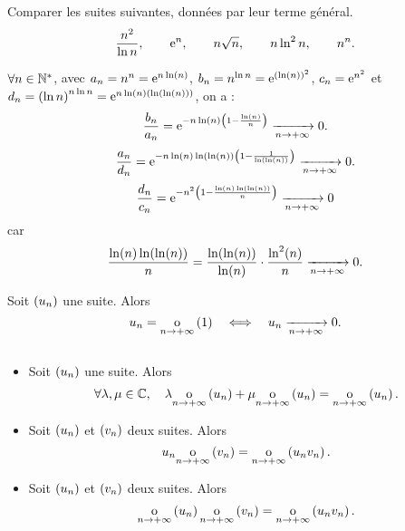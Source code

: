 \documentclass{magnoliaold}
\begin{document}
\begin{exoUnique}
\exo Comparer les suites suivantes, données par leur terme général.
  \[\frac{n^2}{\ln n}, \qquad {\rm e}^{n},\qquad n\sqrt{n}, \qquad n \ln^2 n, \qquad n^n.\]
\end{exoUnique}

\begin{sol}
$\forall n \in {\mathbb{N}^*}$, avec $a_n=n^n={\rm e}^{n\ln(n)}$, $b_n=n^{\ln n}={\rm e}^{\left(\ln(n)\right)^2}$, $c_n={\rm e}^{n^2}$ et $d_n=\left(\ln n\right)^{n\ln n}={\rm e}^{n\ln(n)\left(\ln(\ln(n))\right)}$, on a :
$$\frac{b_n}{a_n}={\rm e}^{-n\ln(n)\left(1-\frac{\ln(n)}{n}\right)}\xrightarrow[n\rightarrow +\infty]{}{0}.$$
$$\frac{a_n}{d_n}={\rm e}^{-n\ln(n)\ln(\ln(n))\left(1-\frac{1}{\ln(\ln(n))}\right)}\xrightarrow[n\rightarrow +\infty]{}{0}.$$
$$\frac{d_n}{c_n}={\rm e}^{-n^2\left(1-\frac{\ln(n)\ln(\ln(n))}{n}\right)}\xrightarrow[n\rightarrow +\infty]{}{0}$$ car $$\frac{\ln(n)\ln(\ln(n))}{n}=\frac{\ln(\ln(n))}{\ln(n)}\cdot \frac{\ln^2(n)}{n}\xrightarrow[n\rightarrow +\infty]{}{0}.$$

\end{sol}

\begin{proposition}[utile=-3]
Soit $\left(u_n\right)$ une suite. Alors
\[u_n=\underset{n \rightarrow +\infty}{\text{o}}\left(1\right) \quad\Longleftrightarrow\quad u_n\xrightarrow[n\rightarrow +\infty]{} 0.\]
\end{proposition}

\begin{proposition}[utile=-3]
$\quad$
\begin{itemize}
\item Soit $\left(u_n\right)$ une suite. Alors
  \[\forall \lambda,\mu\in\mathbb{C} ,\quad \lambda \underset{n \rightarrow +\infty}{\text{o}}\left(u_n\right)
    +\mu\underset{n \rightarrow +\infty}{\text{o}}\left(u_n\right)=\underset{n \rightarrow +\infty}{\text{o}}\left(u_n\right).\]
\item Soit $\left(u_n\right)$ et $\left(v_n\right)$ deux suites. Alors
  \[u_n \underset{n \rightarrow +\infty}{\text{o}}\left(v_n\right)=\underset{n \rightarrow +\infty}{\text{o}}\left(u_n v_n\right).\]
\item Soit $\left(u_n\right)$ et $\left(v_n\right)$ deux suites. Alors
  \[\underset{n \rightarrow +\infty}{\text{o}}\left(u_n\right)\underset{n \rightarrow +\infty}{\text{o}}\left(v_n\right)=
    \underset{n \rightarrow +\infty}{\text{o}}\left(u_n v_n\right).\]
\end{itemize}
\end{proposition}

\end{document}
